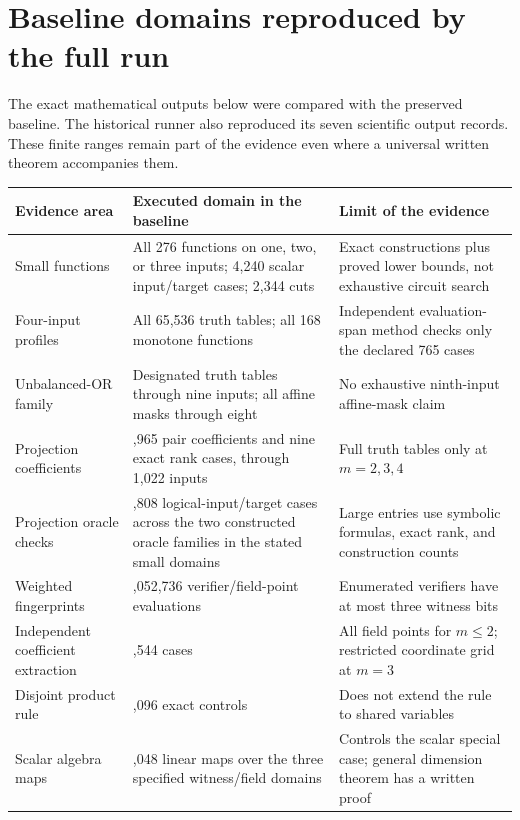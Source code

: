 \section{Baseline domains reproduced by the full run}\label{c:app:evidence}
The exact mathematical outputs below were compared with the preserved baseline. The historical runner also reproduced its seven scientific output records. These finite ranges remain part of the evidence even where a universal written theorem accompanies them.
\small
\begin{longtable}{@{}>{\RaggedRight\arraybackslash}p{1.57in}>{\RaggedRight\arraybackslash}p{2.27in}>{\RaggedRight\arraybackslash}p{2.00in}@{}}
\toprule
\textbf{Evidence area} & \textbf{Executed domain in the baseline} & \textbf{Limit of the evidence}\\\midrule\endhead
Small functions & All 276 functions on one, two, or three inputs; 4,240 scalar input/target cases; 2,344 cuts & Exact constructions plus proved lower bounds, not exhaustive circuit search\\
Four-input profiles & All 65,536 truth tables; all 168 monotone functions & Independent evaluation-span method checks only the declared 765 cases\\
Unbalanced-OR family & Designated truth tables through nine inputs; all affine masks through eight & No exhaustive ninth-input affine-mask claim\\
Projection coefficients & 693,965 pair coefficients and nine exact rank cases, through 1,022 inputs & Full truth tables only at $m=2,3,4$\\
Projection oracle checks & 65,808 logical-input/target cases across the two constructed oracle families in the stated small domains & Large entries use symbolic formulas, exact rank, and construction counts\\
Weighted fingerprints & 1,052,736 verifier/field-point evaluations & Enumerated verifiers have at most three witness bits\\
Independent coefficient extraction & 20,544 cases & All field points for $m\le2$; restricted coordinate grid at $m=3$\\
Disjoint product rule & 4,096 exact controls & Does not extend the rule to shared variables\\
Scalar algebra maps & 66,048 linear maps over the three specified witness/field domains & Controls the scalar special case; general dimension theorem has a written proof\\
\bottomrule
\end{longtable}
\normalsize

